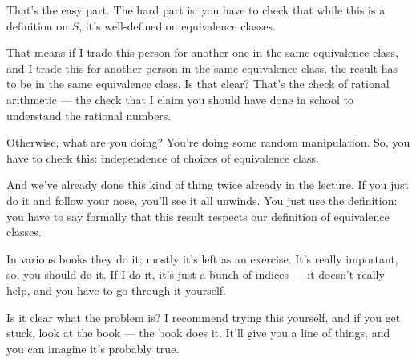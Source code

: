 \begin{speech}[01:00:40 - 01:02:25]
That's the easy part. The hard part is: you have to check that while this is a definition on $S$, it's well-defined on equivalence classes.

That means if I trade this person for another one in the same equivalence class, and I trade this for another person in the same equivalence class, the result has to be in the same equivalence class. Is that clear? That's the check of rational arithmetic --- the check that I claim you should have done in school to understand the rational numbers.

Otherwise, what are you doing? You're doing some random manipulation. So, you have to check this:  independence of choices of equivalence class.

And we've already done this kind of thing twice already in the lecture. If you just do it and follow your nose, you'll see it all unwinds. You just use the definition: you have to say formally that this result respects our definition of equivalence classes.

In various books they do it; mostly it's left as an exercise. It's really important, so, you should do it. If I do it, it's just a bunch of indices --- it doesn't really help, and you have to go through it yourself.

Is it clear what the problem is? I recommend trying this yourself, and if you get stuck, look at the book --- the book does it. It'll give you a line of things, and you can imagine it's probably true.
\end{speech}


